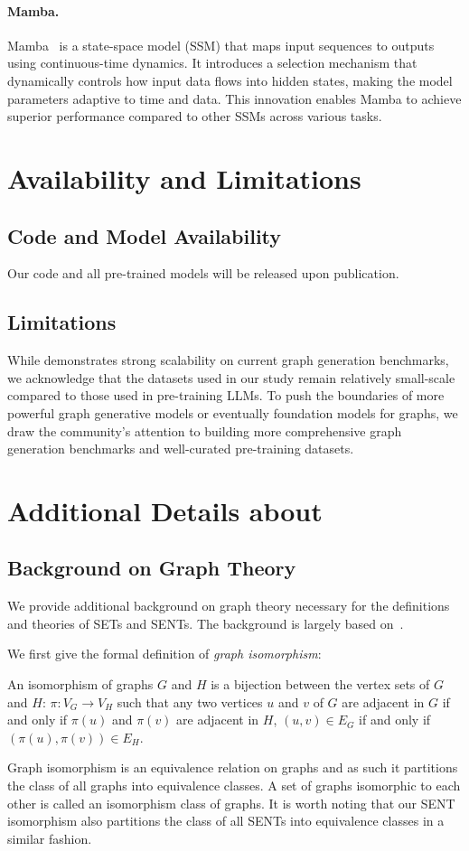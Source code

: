 \paragraph{Mamba.}
Mamba~\citep{gu2023mamba} is a state-space model (SSM) that maps input sequences to outputs using continuous-time dynamics. It introduces a selection mechanism that dynamically controls how input data flows into hidden states, making the model parameters adaptive to time and data. This innovation enables Mamba to achieve superior performance compared to other SSMs across various tasks.

\section{Availability and Limitations}\label{app:sec:limitations}

\subsection{Code and Model Availability}
Our code and all pre-trained models will be released upon publication.

\subsection{Limitations}
While \method{} demonstrates strong scalability on current graph generation benchmarks, we acknowledge that the datasets used in our study remain relatively small-scale compared to those used in pre-training LLMs. To push the boundaries of more powerful graph generative models or eventually foundation models for graphs, we draw the community's attention to building more comprehensive graph generation benchmarks and well-curated pre-training datasets.

\section{Additional Details about \method{}}\label{app:sec:remarks}
\subsection{Background on Graph Theory}
We provide additional background on graph theory necessary for the definitions and theories of SETs and SENTs. The background is largely based on~\citet{diestel2005graph}.

We first give the formal definition of \emph{graph isomorphism}:
\begin{definition}
    An isomorphism of graphs $G$ and $H$ is a bijection between the vertex sets of $G$ and $H$: $\pi:V_G\to V_H$ such that any two vertices $u$ and $v$ of $G$ are adjacent in $G$ if and only if $\pi(u)$ and $\pi(v)$ are adjacent in $H$, \ie $(u,v)\in E_G$ if and only if $(\pi(u),\pi(v))\in E_H$.
\end{definition}
Graph isomorphism is an equivalence relation on graphs and as such it partitions the class of all graphs into equivalence classes. A set of graphs isomorphic to each other is called an isomorphism class of graphs. It is worth noting that our SENT isomorphism also partitions the class of all SENTs into equivalence classes in a similar fashion.

